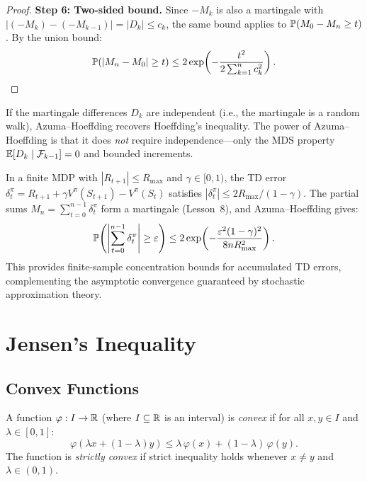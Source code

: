 \documentclass[11pt,a4paper]{article}
\begin{document}
\begin{proof}
\textbf{Step 6: Two-sided bound.}
Since $-M_k$ is also a martingale with
$|(-M_k) - (-M_{k-1})| = |D_k| \leq c_k$, the same bound
applies to $\mathbb{P}(M_0 - M_n \geq t)$.  By the union bound:
\begin{equation}
  \mathbb{P}(|M_n - M_0| \geq t)
  \leq 2\exp\!\left(
    -\frac{t^2}{2\sum_{k=1}^n c_k^2}\right). \qedhere
\end{equation}
\end{proof}

\begin{remark}
If the martingale differences $D_k$ are independent (i.e., the
martingale is a random walk), Azuma--Hoeffding recovers
Hoeffding's inequality.  The power of Azuma--Hoeffding is that it
does \emph{not} require independence---only the MDS property
$\mathbb{E}[D_k \mid \mathcal{F}_{k-1}] = 0$ and bounded increments.
\end{remark}

\begin{rlconnection}[title={Connection to RL: TD Error Concentration}]
In a finite MDP with $|R_{t+1}| \leq R_{\max}$ and
$\gamma \in [0,1)$, the TD error
$\delta_t^\pi = R_{t+1} + \gamma V^\pi(S_{t+1}) - V^\pi(S_t)$
satisfies $|\delta_t^\pi| \leq 2R_{\max}/(1-\gamma)$.
The partial sums $M_n = \sum_{t=0}^{n-1} \delta_t^\pi$ form a
martingale (Lesson~8), and Azuma--Hoeffding gives:
\[
  \mathbb{P}\!\left(\left|\sum_{t=0}^{n-1} \delta_t^\pi\right|
    \geq \varepsilon\right)
  \leq 2\exp\!\left(
    -\frac{\varepsilon^2 (1-\gamma)^2}{8n R_{\max}^2}\right).
\]
This provides finite-sample concentration bounds for accumulated
TD errors, complementing the asymptotic convergence guaranteed by
stochastic approximation theory.
\end{rlconnection}


\section{Jensen's Inequality}
\label{sec:jensen}

\subsection{Convex Functions}
\label{subsec:convex}

\begin{definition}
\label{def:convex}
A function $\varphi: I \to \mathbb{R}$ (where $I \subseteq \mathbb{R}$ is an
interval) is \emph{convex} if for all $x, y \in I$ and
$\lambda \in [0, 1]$:
\begin{equation}
  \varphi(\lambda x + (1 - \lambda) y)
  \leq \lambda\, \varphi(x) + (1 - \lambda)\, \varphi(y).
  \label{eq:convex_def}
\end{equation}
The function is \emph{strictly convex} if strict inequality holds
whenever $x \neq y$ and $\lambda \in (0, 1)$.
\end{definition}
\end{document}
